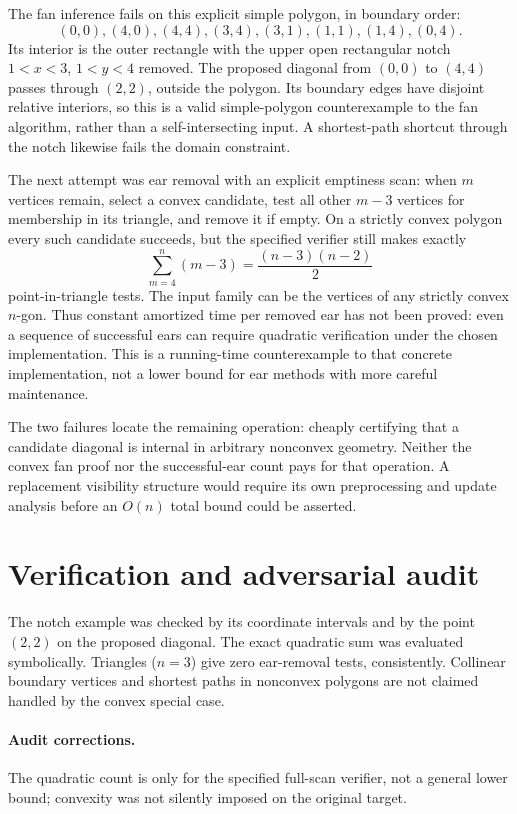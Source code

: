 \documentclass[11pt]{article}
\begin{document}
The fan inference fails on this explicit simple polygon, in boundary order:
\[
 (0,0),(4,0),(4,4),(3,4),(3,1),(1,1),(1,4),(0,4).
\]
Its interior is the outer rectangle with the upper open rectangular notch
$1<x<3$, $1<y<4$ removed. The proposed diagonal from $(0,0)$ to $(4,4)$
passes through $(2,2)$, outside the polygon. Its boundary edges have disjoint
relative interiors, so this is a valid simple-polygon counterexample to the fan
algorithm, rather than a self-intersecting input. A shortest-path shortcut through
the notch likewise fails the domain constraint.

The next attempt was ear removal with an explicit emptiness scan: when $m$
vertices remain, select a convex candidate, test all other $m-3$ vertices for
membership in its triangle, and remove it if empty. On a strictly convex polygon
every such candidate succeeds, but the specified verifier still makes exactly
\[
 \sum_{m=4}^n(m-3)=\frac{(n-3)(n-2)}2
\]
point-in-triangle tests. The input family can be the vertices of any strictly
convex $n$-gon. Thus constant amortized time per removed ear has not been proved:
even a sequence of successful ears can require quadratic verification under the
chosen implementation. This is a running-time counterexample to that concrete
implementation, not a lower bound for ear methods with more careful maintenance.

The two failures locate the remaining operation: cheaply certifying that a
candidate diagonal is internal in arbitrary nonconvex geometry. Neither the
convex fan proof nor the successful-ear count pays for that operation. A
replacement visibility structure would require its own preprocessing and update
analysis before an $O(n)$ total bound could be asserted.
\section{Verification and adversarial audit}
The notch example was checked by its coordinate intervals and by the point
$(2,2)$ on the proposed diagonal. The exact quadratic sum was evaluated
symbolically. Triangles ($n=3$) give zero ear-removal tests, consistently. Collinear
boundary vertices and shortest paths in nonconvex polygons are not claimed
handled by the convex special case.
\paragraph{Audit corrections.} The quadratic count is only for the specified full-scan verifier, not a general lower bound; convexity was not silently imposed on the original target.
\end{document}
